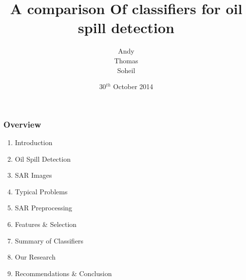 \documentclass{beamer}
\title[Comparison of classifiers]{A comparison Of classifiers for oil spill detection} %
\institute[TUDelft] %
{
Delft University of Technology \\ %
\medskip
}
\date{30$^{th}$ October 2014}
\author{Andy\\ Thomas\\ Soheil} %
\begin{document}
\begin{frame}
\titlepage %
\end{frame}

\begin{frame}
\frametitle{Overview} %
\begin{enumerate}
	\item Introduction
	\item Oil Spill Detection
	\item SAR Images	
	\item Typical Problems
	\item SAR Preprocessing
	\item Features \& Selection
	\item Summary of Classifiers 
	\item Our Research
	\item Recommendations \& Conclusion
\end{enumerate}

\end{frame}



\end{document}
